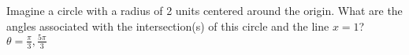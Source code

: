 {Imagine a circle with a radius of 2 units centered around the origin. What are the angles associated with the intersection(s) of this circle and the line $x=1$?}
{$\theta = \frac{\pi}{3}, \frac{5\pi}{3}$}
